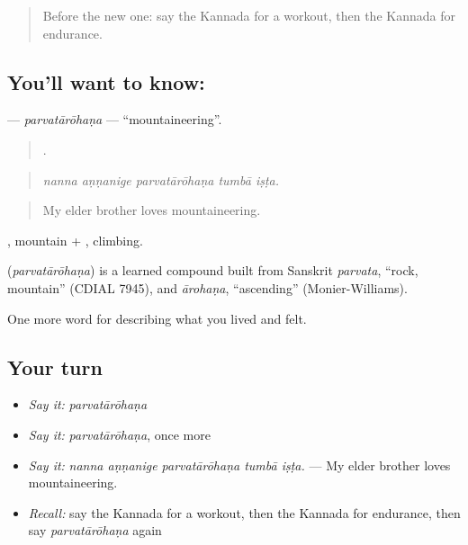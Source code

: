\label{lesson:KA-C541-parvatarohana}



\begin{quote}
Before the new one: say the Kannada for a workout, then the Kannada for endurance.
\end{quote}

\subsection*{You'll want to know: }
\textbf{} — \emph{parvatārōhaṇa} — \textquotedblleft{}mountaineering\textquotedblright{}.

\begin{quote}
    .
\end{quote}

\begin{quote}
\emph{nanna aṇṇanige parvatārōhaṇa tumbā iṣṭa.}
\end{quote}

\begin{quote}
My elder brother loves mountaineering.
\end{quote}

, mountain + , climbing.

\begin{cousinweb}
\textbf{} (\emph{parvatārōhaṇa}) is a learned compound built from Sanskrit \emph{parvata}, \textquotedblleft{}rock, mountain\textquotedblright{} (CDIAL 7945), and \emph{ārohaṇa}, \textquotedblleft{}ascending\textquotedblright{} (Monier-Williams).
\end{cousinweb}

\begin{grammarlens}[title={What you've built}]
One more word for describing what you lived and felt.
\end{grammarlens}

\subsection*{Your turn}
\begin{itemize}
\raggedright
  \item \emph{Say it:} \emph{parvatārōhaṇa}
  \item \emph{Say it:} \emph{parvatārōhaṇa}, once more
  \item \emph{Say it:} \emph{nanna aṇṇanige parvatārōhaṇa tumbā iṣṭa.} — My elder brother loves mountaineering.
  \item \emph{Recall:} say the Kannada for a workout, then the Kannada for endurance, then say \emph{parvatārōhaṇa} again
\end{itemize}

